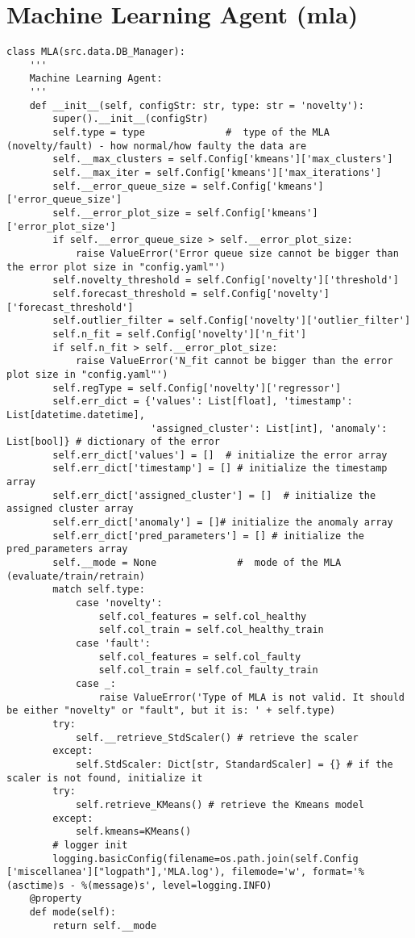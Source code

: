 \section{Machine Learning Agent (\gls{mla})}
\label{sec:mla}
\begin{verbatim}
class MLA(src.data.DB_Manager):
    '''
    Machine Learning Agent:
    '''
    def __init__(self, configStr: str, type: str = 'novelty'):
        super().__init__(configStr)
        self.type = type              #  type of the MLA (novelty/fault) - how normal/how faulty the data are
        self.__max_clusters = self.Config['kmeans']['max_clusters']
        self.__max_iter = self.Config['kmeans']['max_iterations']
        self.__error_queue_size = self.Config['kmeans']['error_queue_size']
        self.__error_plot_size = self.Config['kmeans']['error_plot_size']
        if self.__error_queue_size > self.__error_plot_size:
            raise ValueError('Error queue size cannot be bigger than the error plot size in "config.yaml"')
        self.novelty_threshold = self.Config['novelty']['threshold']
        self.forecast_threshold = self.Config['novelty']['forecast_threshold']
        self.outlier_filter = self.Config['novelty']['outlier_filter']
        self.n_fit = self.Config['novelty']['n_fit']
        if self.n_fit > self.__error_plot_size:
            raise ValueError('N_fit cannot be bigger than the error plot size in "config.yaml"')
        self.regType = self.Config['novelty']['regressor']
        self.err_dict = {'values': List[float], 'timestamp': List[datetime.datetime],
                         'assigned_cluster': List[int], 'anomaly': List[bool]} # dictionary of the error
        self.err_dict['values'] = []  # initialize the error array
        self.err_dict['timestamp'] = [] # initialize the timestamp array
        self.err_dict['assigned_cluster'] = []  # initialize the assigned cluster array
        self.err_dict['anomaly'] = []# initialize the anomaly array
        self.err_dict['pred_parameters'] = [] # initialize the pred_parameters array
        self.__mode = None              #  mode of the MLA (evaluate/train/retrain)
        match self.type:
            case 'novelty':
                self.col_features = self.col_healthy
                self.col_train = self.col_healthy_train
            case 'fault':
                self.col_features = self.col_faulty
                self.col_train = self.col_faulty_train
            case _:
                raise ValueError('Type of MLA is not valid. It should be either "novelty" or "fault", but it is: ' + self.type)
        try:
            self.__retrieve_StdScaler() # retrieve the scaler
        except:
            self.StdScaler: Dict[str, StandardScaler] = {} # if the scaler is not found, initialize it
        try:
            self.retrieve_KMeans() # retrieve the Kmeans model
        except:
            self.kmeans=KMeans()
        # logger init
        logging.basicConfig(filename=os.path.join(self.Config ['miscellanea']["logpath"],'MLA.log'), filemode='w', format='%(asctime)s - %(message)s', level=logging.INFO)
    @property
    def mode(self):
        return self.__mode
    

\end{verbatim}

